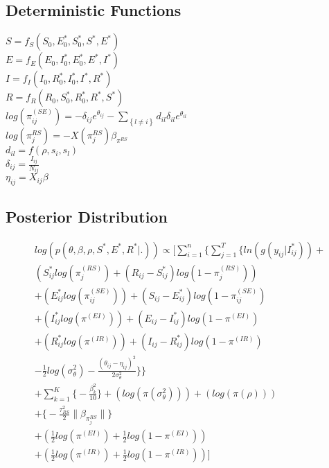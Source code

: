 \documentclass[12pt]{article}
\newcommand \noi {\noindent}
\newcommand \mbreak {\\ \vspace{0.1in}}
\begin{document}
\subsection{Deterministic Functions}

\noi $S = f_S(S_0, E^*_0, S^*_0, S^*, E^*)$ \\

\noi $E = f_E(E_0, I^*_0, E^*_0, E^*, I^*)$ \\

\noi $I = f_I(I_0, R^*_0, I^*_0, I^*, R^*)$ \\

\noi $R = f_R(R_0, S^*_0, R^*_0, R^*, S^*)$ \\

\noi $\displaystyle log(\pi^{(SE)}_{ij}) = -\delta_{ij}e^{\theta_{ij}} - \sum_{\left\{ l \ne i \right\}}d_{il}\delta_{il}e^{\theta_{il}}$\\

\noi $log(\pi_j^{RS}) = -X(\pi_j^{RS}) \beta_{\pi^{RS}}$\\

\noi $d_{il} = f(\rho, s_i, s_l)$\\

\noi $\delta_{ij} = \frac{I_{ij}}{N_{ij}}$ \\

\noi $\eta_{ij} = X_{ij}\beta$\mbreak

\subsection{Posterior Distribution}

\begin{center}
\begin{multline}
\displaystyle
log(p(\theta,\beta,\rho,S^*,E^*,R^*|.)) \propto \Bigg[ 
    \sum_{i=1}^n \bigg\{ \sum_{j=1}^T
        \Big\{ ln(g(y_{ij}|I^*_{ij})) + \\ 
            (S^*_{ij}log(\pi_j^{(RS)}) + (R_{ij} - S^*_{ij})log(1-\pi_j^{(RS)})) \\
            + (E^*_{ij}log(\pi_{ij}^{(SE)})) + (S_{ij} - E^*_{ij})log(1-\pi_{ij}^{(SE)}) \\
            + (I^*_{ij}log(\pi^{(EI)})) + (E_{ij} - I^*_{ij})log(1-\pi^{(EI)}) \\
            + (R^*_{ij}log(\pi^{(IR)})) + (I_{ij} - R^*_{ij})log(1-\pi^{(IR)}) \\
    - \frac{1}{2}log(\sigma^2_{\theta}) - \frac{(\theta_{ij}-\eta_{ij})^2}{2\sigma^2_{\theta}}\Big\}\bigg\} \\
    + \sum_{k = 1}^K\bigg\{-\frac{\beta^2_k}{10}\bigg\}
            + (log(\pi(\sigma^2_{\theta})))
            + (log(\pi(\rho)))\\
            + \bigg\{ -\frac{\tau^2_{RS}}{2}\|\beta_{\pi_j^{RS}}\|  \bigg\} \\ 
            + (\frac{1}{2}log(\pi^{(EI)}) + \frac{1}{2}log(1-\pi^{(EI)})) \\
            + (\frac{1}{2}log(\pi^{(IR)}) + \frac{1}{2}log(1-\pi^{(IR)})) \Bigg]\\
\end{multline}
\end{center}
\end{document}
